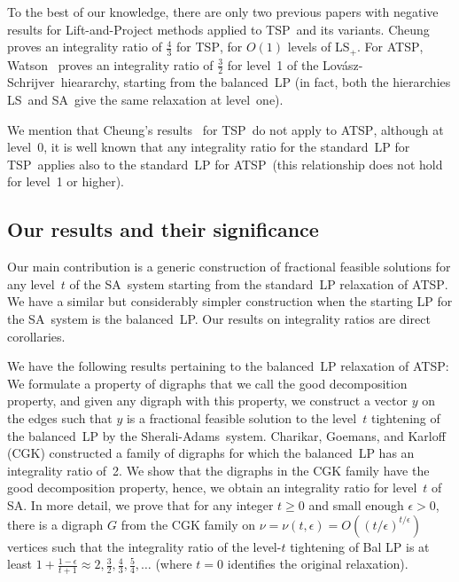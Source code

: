 \documentclass[11pt]{article}
\newcommand{\sa}{\textsf{Sherali-Adams}}
\newcommand{\ls}{\textsf{Lov\'asz-Schrijver}}
\newcommand{\iLS}{\textsf{LS}}
\newcommand{\iLSp}{\textsf{LS}$_+$}
\newcommand{\iSA}{\textsf{SA}}
\newcommand{\tsp}{\textsc{TSP}}
\newcommand{\atsp}{\textsc{ATSP}}
\begin{document}
To the best of our knowledge, there are only two previous papers with
negative results for Lift-and-Project methods applied to \tsp\ and its
variants.
Cheung~\cite{cheung05} proves an integrality ratio of
$\frac43$ for \tsp, for $O(1)$ levels of \iLSp.
For \atsp, Watson~\cite{watson11} proves an integrality ratio of
$\frac32$ for level~1 of the \ls\ hieararchy, starting from the
balanced~LP (in fact, both the hierarchies \iLS\ and \iSA\ give the
same relaxation at level~one).

We mention that Cheung's results~\cite{cheung05}
for \tsp\ do not apply to \atsp, although
at level~0, it is well known that
any integrality ratio for the standard~LP for \tsp\
applies also to the standard~LP for \atsp\ 
(this relationship does not hold for level~1 or higher).



\subsection{Our results and their significance}


Our main contribution
is a generic construction of
fractional feasible solutions
for any level~$t$ of the \iSA\ system starting from
the standard~LP relaxation of \atsp.
We have a similar but considerably simpler construction
when the starting LP for the \iSA\ system
is the balanced~LP.
Our results on integrality ratios are direct corollaries.


We have the following results pertaining to
the balanced~LP relaxation of \atsp:
We formulate a property of digraphs that we call
the good decomposition property, and
given any digraph with this property,
we construct a vector $y$ on the edges such that
$y$ is a fractional feasible solution to
the level~$t$ tightening of the balanced~LP by the \sa\ system.
Charikar, Goemans, and Karloff (CGK) \cite{CGK06}
constructed a family of digraphs for which
the balanced~LP has an integrality ratio of~2.
We show that the digraphs in the CGK family
have the good decomposition property,
hence, we obtain an integrality ratio for level~$t$ of \iSA.
In more detail,
we prove that for any integer $t\ge0$ and small enough $\epsilon>0$,
there is a digraph $G$ from the CGK family
on $\nu=\nu(t,\epsilon)=O((t/\epsilon)^{t/\epsilon})$
vertices such that the integrality ratio of the level-$t$ tightening of
Bal LP is at least
$1+\frac{1-\epsilon}{t+1} \approx 2, \frac32, \frac43, \frac54,
\dots$ (where $t=0$ identifies the original relaxation). 
\end{document}
